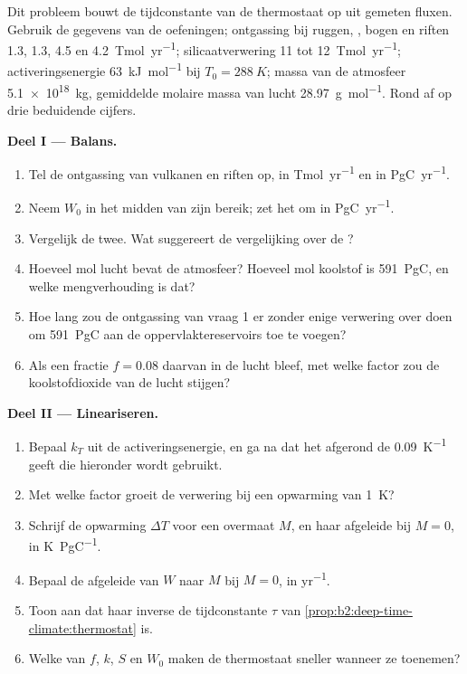 \begin{problem}\label{pb:b2:deep-time-climate:1}
Dit probleem bouwt de tijdconstante van de thermostaat op uit gemeten fluxen. Gebruik de gegevens van de
oefeningen; ontgassing bij ruggen, , bogen en riften \num{1.3}, \num{1.3}, 4.5 en
\qty{4.2}{Tmol.yr^{-1}}; silicaatverwering 11 tot \qty{12}{Tmol.yr^{-1}}; activeringsenergie
\qty{63}{kJ.mol^{-1}} bij $T_0 = \qty{288}{K}$; massa van de atmosfeer \qty{5.1e18}{kg}, gemiddelde molaire
massa van lucht \qty{28.97}{g.mol^{-1}}. Rond af op drie beduidende cijfers.

\noindent\textbf{Deel I --- Balans.}
\begin{enumerate}
  \item Tel de ontgassing van vulkanen en riften op, in \unit{Tmol.yr^{-1}} en in \unit{PgC.yr^{-1}}.
  \item Neem $W_0$ in het midden van zijn bereik; zet het om in \unit{PgC.yr^{-1}}.
  \item Vergelijk de twee. Wat suggereert de vergelijking over de ?
  \item Hoeveel mol lucht bevat de atmosfeer? Hoeveel mol koolstof is \qty{591}{PgC},
        en welke mengverhouding is dat?
  \item Hoe lang zou de ontgassing van vraag 1 er zonder enige verwering over doen om
        \qty{591}{PgC} aan de oppervlaktereservoirs toe te voegen?
  \item Als een fractie $f = 0.08$ daarvan in de lucht bleef, met welke factor zou de
        koolstofdioxide van de lucht stijgen?
\end{enumerate}

\noindent\textbf{Deel II --- Lineariseren.}
\begin{enumerate}[resume]
  \item Bepaal $k_T$ uit de activeringsenergie, en ga na dat het afgerond de
        \qty{0.09}{K^{-1}} geeft die hieronder wordt gebruikt.
  \item Met welke factor groeit de verwering bij een opwarming van \qty{1}{K}?
  \item Schrijf de opwarming $\Delta T$ voor een overmaat $M$, en haar afgeleide bij $M = 0$, in
        \unit{K.PgC^{-1}}.
  \item Bepaal de afgeleide van $W$ naar $M$ bij $M = 0$, in \unit{yr^{-1}}.
  \item Toon aan dat haar inverse de tijdconstante $\tau$ van
        \cref{prop:b2:deep-time-climate:thermostat} is.
  \item Welke van $f$, $k$, $S$ en $W_0$ maken de thermostaat sneller wanneer ze toenemen?
\end{enumerate}


\end{problem}

